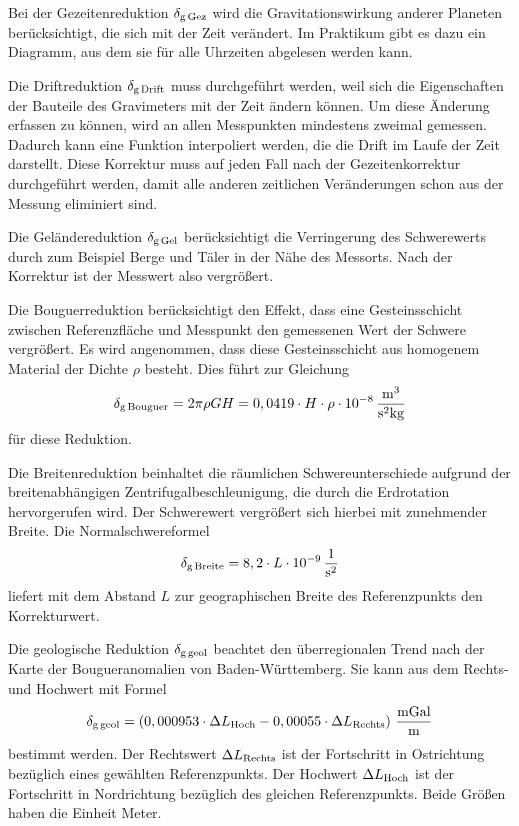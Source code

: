 Bei der Gezeitenreduktion $\delta_{\mathrm{g\,Gez}}$ wird die Gravitationswirkung anderer Planeten berücksichtigt, die sich mit der Zeit verändert. Im Praktikum gibt es dazu ein Diagramm, aus dem sie für alle Uhrzeiten abgelesen werden kann.

Die Driftreduktion $\delta_{\mathrm{g\,Drift}}$ muss durchgeführt werden, weil sich die Eigenschaften der Bauteile des Gravimeters mit der Zeit ändern können. Um diese Änderung erfassen zu können, wird an allen Messpunkten mindestens zweimal gemessen. Dadurch kann eine Funktion interpoliert werden, die die Drift im Laufe der Zeit darstellt. Diese Korrektur muss auf jeden Fall nach der Gezeitenkorrektur durchgeführt werden, damit alle anderen zeitlichen Veränderungen schon aus der Messung eliminiert sind.

Die Geländereduktion $\delta_{\mathrm{g\,Gel}}$ berücksichtigt die Verringerung des Schwerewerts durch zum Beispiel Berge und Täler in der Nähe des Messorts. Nach der Korrektur ist der Messwert also vergrößert.

Die Bouguerreduktion berücksichtigt den Effekt, dass eine Gesteinsschicht zwischen Referenzfläche und Messpunkt den gemessenen Wert der Schwere vergrößert. Es wird angenommen, dass diese Gesteinsschicht aus homogenem Material der Dichte $\rho$ besteht. Dies führt zur Gleichung
\begin{equation}
 \delta_{\mathrm{g\,Bouguer}}=2\pi\rho GH=0,0419\cdot H\cdot\rho\cdot 10^{-8}\,\frac{\mathrm{m^3}}{\mathrm{s^2kg}}
\end{equation}
für diese Reduktion.

Die Breitenreduktion beinhaltet die räumlichen Schwereunterschiede aufgrund der breitenabhängigen Zentrifugalbeschleunigung, die durch die Erdrotation hervorgerufen wird. Der Schwerewert vergrößert sich hierbei mit zunehmender Breite. Die Normalschwereformel
\begin{equation}
 \delta_{\mathrm{g\,Breite}}=8,2\cdot L\cdot 10^{-9}\,\frac{\mathrm{1}}{\mathrm{s^2}}
\end{equation}
liefert mit dem Abstand $L$ zur geographischen Breite des Referenzpunkts den Korrekturwert.

Die geologische Reduktion $\delta_{\mathrm{g\, geol}}$ beachtet den überregionalen Trend nach der Karte der Bougueranomalien von Baden-Württemberg. Sie kann aus dem Rechts- und Hochwert mit Formel
\begin{equation}
 \delta_{\mathrm{g\, geol}}=\left( 0,000953\cdot \Delta L_{\mathrm{Hoch}} - 0,00055 \cdot \Delta L_{\mathrm{Rechts}} \right) \,\frac{\mathrm{mGal}}{\mathrm{m}}
\end{equation}
bestimmt werden. Der Rechtswert $\Delta L_{\mathrm{Rechts}}$ ist der Fortschritt in Ostrichtung bezüglich eines gewählten Referenzpunkts.
Der Hochwert $\Delta L_{\mathrm{Hoch}}$ ist der Fortschritt in Nordrichtung bezüglich des gleichen Referenzpunkts. Beide Größen haben die Einheit Meter.

